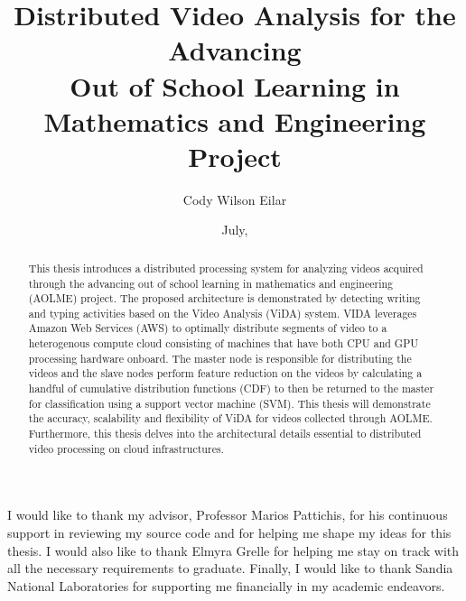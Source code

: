 \documentclass[botnum, fleqn]{unmeethesis}
\begin{document}
  \frontmatter



  \title{Distributed Video Analysis for the  Advancing  \\
  Out of School Learning in Mathematics and Engineering Project}

  \author{Cody Wilson Eilar}
  \date{July, \thisyear}

  \maketitle



  \begin{acknowledgments}
    \vspace{1.1in}
    I would like to thank my advisor, Professor Marios Pattichis, for his
    continuous support in reviewing my source code and for helping me shape my
    ideas for this thesis. I would also like to thank Elmyra Grelle for helping
    me stay on track with all the necessary requirements to graduate. Finally, I
    would like to thank Sandia National Laboratories for supporting me
    financially in my academic endeavors.
  \end{acknowledgments}

  \maketitleabstract %

  \begin{abstract}
    This thesis introduces a distributed processing system for analyzing videos
    acquired through the advancing out of school learning in mathematics and
    engineering (AOLME) project. The proposed architecture is demonstrated by
    detecting writing and typing activities based on the Video Analysis (ViDA)
    system. VIDA leverages Amazon Web Services (AWS) to optimally distribute
    segments of video to a heterogenous compute cloud consisting of machines
    that have both CPU and GPU processing hardware onboard. The master node is
    responsible for distributing the videos and the slave nodes perform feature
    reduction on the videos by calculating a handful of cumulative distribution
    functions (CDF) to then be returned to the master for classification using a
    support vector machine (SVM). This thesis will demonstrate the accuracy,
    scalability and flexibility of ViDA for videos collected through AOLME.
    Furthermore, this thesis delves into the architectural details essential to
    distributed video processing on cloud infrastructures.

    \clearpage %
  \end{abstract}
\end{document}
